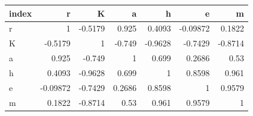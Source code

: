 \begin{tabular}{lrrrrrr}
\toprule
index & r & K & a & h & e & m \\
\midrule
r & 1 & -0.5179 & 0.925 & 0.4093 & -0.09872 & 0.1822 \\
K & -0.5179 & 1 & -0.749 & -0.9628 & -0.7429 & -0.8714 \\
a & 0.925 & -0.749 & 1 & 0.699 & 0.2686 & 0.53 \\
h & 0.4093 & -0.9628 & 0.699 & 1 & 0.8598 & 0.961 \\
e & -0.09872 & -0.7429 & 0.2686 & 0.8598 & 1 & 0.9579 \\
m & 0.1822 & -0.8714 & 0.53 & 0.961 & 0.9579 & 1 \\
\bottomrule
\end{tabular}
